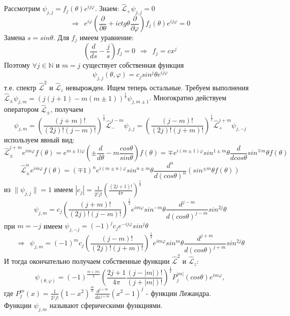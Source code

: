 	Рассмотрим $\psi_{j,j} = f_j(\theta)e^{ij\varphi}$. Знаем: $\hat{\mathcal{L}}_{+}\psi_{j,j} = 0$
	$$
		\Rightarrow \ \ e^{i\varphi}\left(\frac{\partial}{\partial\theta} + ictg\theta\frac{\partial}{\partial\varphi}\right)f_j(\theta)e^{ij\varphi} = 0
	$$
	Замена $s = sin\theta$. Для $f_j$ имеем уравнение:
	$$
		\left(\frac{d}{ds}-\frac{j}{s}\right)f_j = 0 \ \ \Rightarrow \ \ f_j = cx^j
	$$
	Поэтому $\forall j \in\mathbb{N}$ и $m = j$ существует собственная функция 
	$$
		\psi_{j,j} (\theta,\varphi) = c_j sin^j\theta e^{ij\varphi}
	$$
	т.е. спектр $\hat{\mathcal{L}}^2$ и $\hat{\mathcal{L}}_z$ невырожден. Ищем теперь остальные. Требуем выполнения $\hat{\mathcal{L}}_{\pm}\psi_{j,m} = (j(j + 1)-m(m\pm1))^{\frac{1}{2}}\psi_{j,m\pm1}$. Многократно действуем оператором $\hat{\mathcal{L}}_{\pm}$, получаем 
	$$
		\psi_{j,m} = \left(\frac{(j + m)!}{(2j)!(j-m)!}\right)^{\frac{1}{2}}\hat{\mathcal{L}}^{j-m}_{-}\psi_{j,j} = \left(\frac{(j - m)!}{(2j)!(j+m)!}\right)^{\frac{1}{2}}\hat{\mathcal{L}}^{j+m}_{+}\psi_{j,-j}
	$$
	используем явный вид:
	$$
		\hat{\mathcal{L}}^{j+m}_{\pm}e^{im\varphi}f(\theta) = e^{m\pm1)\varphi}\left(\pm\frac{d}{d\theta}-m\frac{cos\theta}{sin\theta}\right)f(\theta) = \mp e^{i(m\pm1)\varphi}sin^{1\pm m}\theta \frac{d}{dcos\theta}sin^{\mp m}\theta f(\theta)
	$$
	$$
		\hat{\mathcal{L}}^{n}_{\pm} e^{im\varphi}f(\theta)=(\mp1)^ne^{i(m\pm n)\varphi}sin^{n\pm m}\theta \frac{d^n}{d(cos\theta)^n}(sin^{\pm m}\theta f(\theta))
	$$
	из $\|\psi_{j,j}\|=1$ имеем $|c_j| = \frac{1}{2^jj!}\left(\frac{(2j+1)!}{4\pi}\right)^{\frac{1}{2}}$
	$$
		\psi_{j,m} = c_j\left(\frac{(j + m)!}{(2j)!(j-m)!}\right)^{\frac{1}{2}}e^{im\varphi}sin^{-m}\theta\frac{d^{j-m}}{d(cos\theta)^{j-m}}sin^{2j}\theta
	$$
	при $m = -j$ имеем $\psi_{j,-j} = (-1)^jc_je^{-ij\varphi}sin^j\theta$
	$$
		\Rightarrow \ \ \psi_{j,m} = (-1)^mc_j\left(\frac{(j-m)!}{(2j)!(j+m)!}\right)^{\frac{1}{2}}e^{im\varphi}sin^m\theta\frac{d^{j+m}}{d(cos\theta)^{j+m}}sin^{2j}\theta
	$$
	И тогда окончательно получаем собственные функции $\hat{\mathcal{L}}^2$ и $\hat{\mathcal{L}}_z$:
	$$
		\psi_(\theta,\varphi) = (-1)^{\frac{m+|m|}{2}}\left(\frac{2j+1}{4\pi}\frac{(j-|m|)!}{(j+|m|)!}\right)^{\frac{1}{2}}P^{|m|}_j(cos\theta)e^{im\varphi},
	$$
	где $P^m_j(x) = \frac{1}{2^jj!}(1-x^2)^{\frac{m}{2}}\frac{d^{j+m}}{dx^{j+m}}(x^2-1)^j$ - функции Лежандра.\\
	Функции $\psi_{j,m}$ называют сферическими функциями. 
